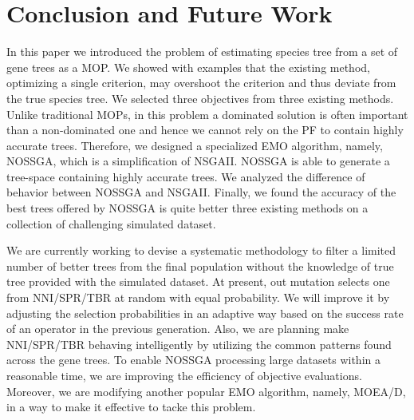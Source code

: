 \section{Conclusion and Future Work}
In this paper we introduced the problem of estimating species tree from a set of gene trees as a MOP. We showed with examples that the existing method, optimizing a single criterion, may overshoot the criterion and thus deviate from the true species tree. We selected three objectives from three existing methods. Unlike traditional MOPs, in this problem a dominated solution is often important than a non-dominated one and hence we cannot rely on the PF to contain highly accurate trees. Therefore, we designed a specialized EMO algorithm, namely, NOSSGA, which is a simplification of NSGAII. NOSSGA is able to generate a tree-space containing highly accurate trees. We analyzed the difference of behavior between NOSSGA and NSGAII. Finally, we found the accuracy of the best trees offered by NOSSGA is quite better three existing methods on a collection of challenging simulated dataset. 

We are currently working to devise a systematic methodology to filter a limited number of better trees from the final population without the knowledge of true tree provided with the simulated dataset. At present, out mutation selects one from NNI/SPR/TBR at random with equal probability. We will improve it by adjusting the selection probabilities in an adaptive way based on the success rate of an operator in the previous generation. Also, we are planning make NNI/SPR/TBR behaving intelligently by utilizing the common patterns found across the gene trees. To enable NOSSGA processing large datasets within a reasonable time, we are improving the efficiency of objective evaluations. Moreover, we are modifying another popular EMO algorithm, namely, MOEA/D, in a way to make it effective to tacke this problem.